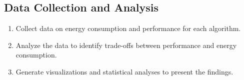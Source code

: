\subsection{Data Collection and Analysis}
\label{subsec:data_collection}

\begin{enumerate}
	\item Collect data on energy consumption and performance for each algorithm.
	\item Analyze the data to identify trade-offs between performance and energy consumption.
	\item Generate visualizations and statistical analyses to present the findings.
\end{enumerate}
